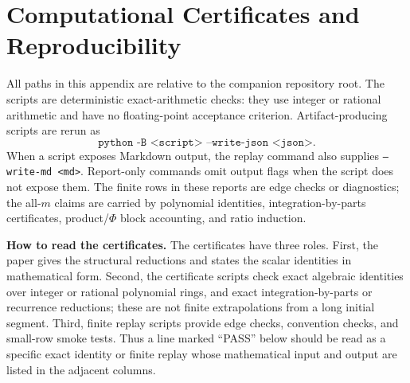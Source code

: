 \section{Computational Certificates and Reproducibility}\label{app:certs}

All paths in this appendix are relative to the companion repository root.  The scripts are deterministic exact-arithmetic checks:
they use integer or rational arithmetic and have no floating-point acceptance criterion.  Artifact-producing scripts are rerun as
\[
  \texttt{python -B <script> --write-json <json>}.
\]
When a script exposes Markdown output, the replay command also supplies \texttt{--write-md <md>}.  Report-only commands omit output flags when the script does not expose them.  The finite rows in these reports are edge checks or diagnostics; the all-$m$ claims are carried by polynomial
identities, integration-by-parts certificates, product/$\Phi$ block accounting, and ratio induction.

\medskip
\noindent\textbf{How to read the certificates.}
The certificates have three roles.  First, the paper gives the structural reductions and states the scalar identities in mathematical form.  Second, the certificate scripts check exact algebraic identities over integer or rational polynomial rings, and exact integration-by-parts or recurrence reductions; these are not finite extrapolations from a long initial segment.  Third, finite replay scripts provide edge checks, convention checks, and small-row smoke tests.  Thus a line marked ``PASS'' below should be read as a specific exact identity or finite replay whose mathematical input and output are listed in the adjacent columns.

